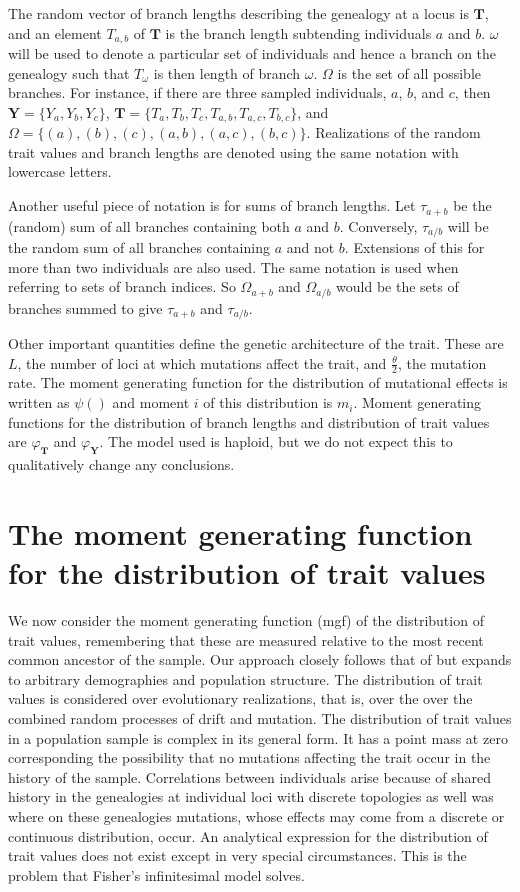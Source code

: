 \documentclass{article}
\newcommand{\T}{\frac{\theta}{2}}
\begin{document}
The random vector of branch lengths describing the genealogy at a locus is
$\mathbf{T}$, and an element $T_{a,b}$ of $\mathbf{T}$ is the branch length
subtending individuals $a$ and $b$. $\omega$ will be used to denote a particular
set of individuals and hence a branch on the genealogy such that $T_\omega$ is
then length of branch $\omega$. $\Omega$ is the set of all possible branches.
For instance, if there are three sampled individuals, $a$, $b$, and $c$, then
$\mathbf{Y}=\{Y_a,Y_b,Y_c\}$,
$\mathbf{T}=\{T_a,T_b,T_c,T_{a,b},T_{a,c},T_{b,c}\}$, and
$\Omega=\{(a),(b),(c),(a,b),(a,c),(b,c)\}$. Realizations of the random trait
values and branch lengths are denoted using the same notation with lowercase
letters.

Another useful piece of notation is for sums of branch lengths. Let $\tau_{a+b}$
be the (random) sum of all branches containing both $a$ and $b$. Conversely,
$\tau_{a/b}$ will be the random sum of all branches containing $a$ and not $b$.
Extensions of this for more than two individuals are also used. The same
notation is used when referring to sets of branch indices. So $\Omega_{a+b}$ and
$\Omega_{a/b}$ would be the sets of branches summed to give $\tau_{a+b}$ and
$\tau_{a/b}$.

Other important quantities define the genetic architecture of the trait. These
are $L$, the number of loci at which mutations affect the trait, and $\T$, the
mutation rate. The moment generating function for the distribution of mutational
effects is written as $\psi()$ and moment $i$ of this distribution is $m_i$.
Moment generating functions for the distribution of branch lengths and
distribution of trait values are $\varphi_{\mathbf{T}}$ and
$\varphi_{\mathbf{Y}}$. The model used is haploid, but we do not expect this to
qualitatively change any conclusions.
\section{The moment generating function for the distribution of trait values}
We now consider the moment generating function (mgf) of the distribution of
trait values, remembering that these are measured relative to the most recent
common ancestor of the sample. Our approach closely follows that of
\citet{Schraiber2015} but expands to arbitrary demographies and population
structure. The distribution of trait values is considered over evolutionary
realizations, that is, over the over the combined random processes of drift and
mutation. The distribution of trait values in a population sample is complex in
its general form. It has a point mass at zero corresponding the possibility that
no mutations affecting the trait occur in the history of the sample.
Correlations between individuals arise because of shared history in the
genealogies at individual loci with discrete topologies as well was where on
these genealogies mutations, whose effects may come from a discrete or
continuous distribution, occur. An analytical expression for the distribution of
trait values does not exist except in very special circumstances. This is the
problem that Fisher's infinitesimal model solves.
\end{document}
